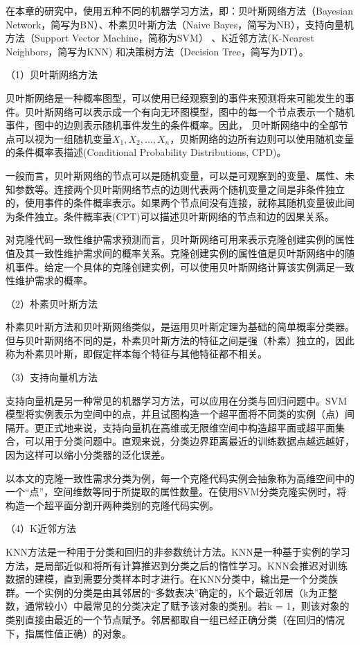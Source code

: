 在本章的研究中，使用五种不同的机器学习方法，即：贝叶斯网络方法（Bayesian Network，简写为BN）\cite{friedman1997bayesian,pearl1985bayesian}、朴素贝叶斯方法（Naive Bayes，简写为NB）\cite{john1995estimating}，支持向量机方法（Support Vector Machine，简称为SVM）\cite{platt199912} 、K近邻方法(K-Nearest Neighbors，简写为KNN) \cite{aha1991instance}和决策树方法（Decision Tree，简写为DT）\cite{quinlan2014c4}。

（1）贝叶斯网络方法

贝叶斯网络是一种概率图型，可以使用已经观察到的事件来预测将来可能发生的事件\cite{friedman1997bayesian}。贝叶斯网络可以表示成一个有向无环图模型，图中的每一个节点表示一个随机事件，图中的边则表示随机事件发生的条件概率。因此， 贝叶斯网络中的全部节点可以视为一组随机变量{$X_{1},X_{2},...,X_{n}$}，贝斯网络的边所有边则可以使用随机变量的条件概率表描述(Conditional Probability Distributions, CPD)。

一般而言，贝叶斯网络的节点可以是随机变量，可以是可观察到的变量、属性、未知参数等。连接两个贝叶斯网络节点的边则代表两个随机变量之间是非条件独立的，使用事件的条件概率表示。如果两个节点间没有连接，就称其随机变量彼此间为条件独立。条件概率表(CPT)可以描述贝叶斯网络的节点和边的因果关系。

对克隆代码一致性维护需求预测而言，贝叶斯网络可用来表示克隆创建实例的属性值及其一致性维护需求间的概率关系。克隆创建实例的属性值是贝叶斯网络中的随机事件。给定一个具体的克隆创建实例，可以使用贝叶斯网络计算该实例满足一致性维护需求的概率。

（2）朴素贝叶斯方法

朴素贝叶斯方法和贝叶斯网络类似，是运用贝叶斯定理为基础的简单概率分类器。但与贝叶斯网络不同的是，朴素贝叶斯方法的特征之间是强（朴素）独立的，因此称为朴素贝叶斯，即假定样本每个特征与其他特征都不相关。 

（3）支持向量机方法

支持向量机是另一种常见的机器学习方法，可以应用在分类与回归问题中。SVM模型将实例表示为空间中的点，并且试图构造一个超平面将不同类的实例（点）间隔开。更正式地来说，支持向量机在高维或无限维空间中构造超平面或超平面集合，可以用于分类问题中。直观来说，分类边界距离最近的训练数据点越远越好，因为这样可以缩小分类器的泛化误差。

以本文的克隆一致性需求分类为例，每一个克隆代码实例会抽象称为高维空间中的一个“点”，空间维数等同于所提取的属性数量。在使用SVM分类克隆实例时，将构造一个超平面分割开两种类别的克隆代码实例。

（4）K近邻方法

KNN方法是一种用于分类和回归的非参数统计方法。KNN是一种基于实例的学习方法，是局部近似和将所有计算推迟到分类之后的惰性学习。KNN会推迟对训练数据的建模，直到需要分类样本时才进行。在KNN分类中，输出是一个分类族群。一个实例的分类是由其邻居的“多数表决”确定的，K个最近邻居（k为正整数，通常较小）中最常见的分类决定了赋予该对象的类别。若k = 1，则该对象的类别直接由最近的一个节点赋予。邻居都取自一组已经正确分类（在回归的情况下，指属性值正确）的对象。

